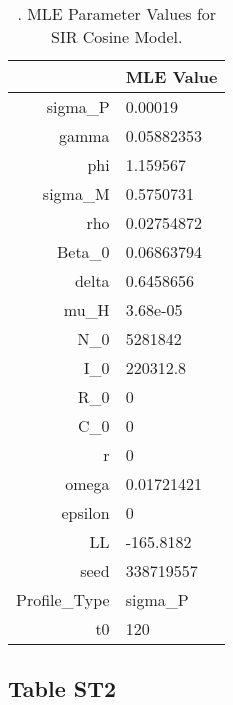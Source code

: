 \documentclass{article}
\begin{document}
\begin{table}[ht]
\centering
\begin{tabular}{rl}
  \hline
 & MLE Value \\ 
  \hline
sigma\_P & 0.00019 \\ 
  gamma & 0.05882353 \\ 
  phi & 1.159567 \\ 
  sigma\_M & 0.5750731 \\ 
  rho & 0.02754872 \\ 
  Beta\_0 & 0.06863794 \\ 
  delta & 0.6458656 \\ 
  mu\_H & 3.68e-05 \\ 
  N\_0 & 5281842 \\ 
  I\_0 & 220312.8 \\ 
  R\_0 & 0 \\ 
  C\_0 & 0 \\ 
  r & 0 \\ 
  omega & 0.01721421 \\ 
  epsilon & 0 \\ 
  LL & -165.8182 \\ 
  seed & 338719557 \\ 
  Profile\_Type & sigma\_P \\ 
  t0 & 120 \\ 
   \hline
\end{tabular}
\caption{. MLE Parameter Values for SIR Cosine Model. 
} 
\label{Supplemental Table:MLE_values}
\end{table}
\newpage

\subsection{Table ST2}
\end{document}
